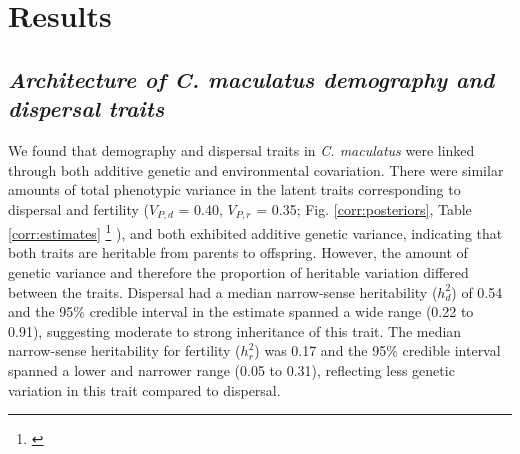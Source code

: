 \documentclass[11pt]{article}
\newcommand{\tom}[1]{{\textit{\color{WildStrawberry}{[#1]}}}}
\begin{document}
\section*{Results}

\subsection*{\textit{Architecture of \textup{C. maculatus} demography and dispersal traits}}
We found that demography and dispersal traits in \textit{C. maculatus} were linked through both additive genetic and environmental covariation.
There were similar amounts of total phenotypic variance in the latent traits corresponding to dispersal and fertility ($V_{P,d}$  = 0.40, $V_{P,r}$  = 0.35; Fig. \ref{corr:posteriors}, Table \ref{corr:estimates}
\footnote{\tom{Need to check with Brad about interpretation of phenotype values in this table. For example mean dispersal phenotype is 2.74. If I am correct that this is log offspring, then this equals 15.48 offspring, which is much less than the average in OandM 2017 Figure 4. However, maybe it is female offspring, which would make the value more reasonable.}}
), and both exhibited additive genetic variance, indicating that both traits are heritable from parents to offspring.
However, the  amount of genetic variance and therefore the proportion of heritable variation differed between the traits.
Dispersal had a median narrow-sense heritability ($h^{2}_{d}$) of 0.54 and the 95\% credible interval in the estimate spanned a wide range (0.22 to 0.91), suggesting moderate to strong inheritance of this trait.
The median narrow-sense heritability for fertility ($h^{2}_{r}$) was 0.17 and the 95\% credible interval spanned a lower and narrower range (0.05 to 0.31), reflecting less genetic variation in this trait compared to dispersal.
\end{document}
